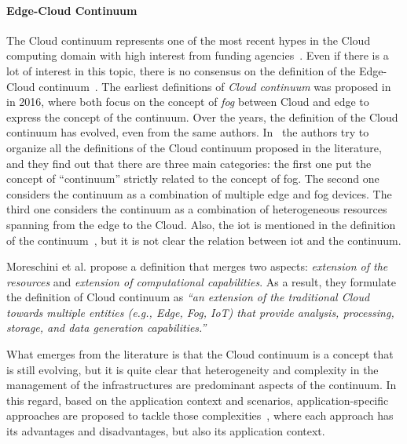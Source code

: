 \documentclass[12pt,a4paper]{article}
\begin{document}
\paragraph{Edge-Cloud Continuum}
The Cloud continuum represents one of the most recent hypes in the Cloud computing domain with high interest from funding agencies~\cite{ict-40-2020, horizon-cl4-2022-data-01-02}.
%
Even if there is a lot of interest in this topic,
there is no consensus on the definition of the Edge-Cloud continuum~\cite{DBLP:journals/access/MoreschiniPLNHT22}.
%
The earliest definitions of \emph{Cloud continuum} was proposed in~\cite{DBLP:journals/corr/GuptaNCG16, DBLP:journals/iotj/ChiangZ16} in 2016,
where both focus on the concept of \emph{fog} between Cloud and edge to express the concept of the continuum.
%
Over the years, the definition of the Cloud continuum has evolved,
even from the same authors.
%
In~\cite{DBLP:journals/access/MoreschiniPLNHT22} the authors try to organize all the definitions of the Cloud continuum proposed in the literature,
and they find out that there are three main categories: the first one put the concept of ``continuum'' strictly related to the concept of fog.
%
The second one considers the continuum as a combination of multiple edge and fog devices.
%
The third one considers the continuum as a combination of heterogeneous resources spanning from the edge to the Cloud.
%
Also, the \ac{iot} is mentioned in the definition of the continuum~\cite{DBLP:conf/ucc/SpillnerGBV20, 9116796},
but it is not clear the relation between \ac{iot} and the continuum.

Moreschini et al. propose a definition that merges two aspects: \emph{extension of the resources} and \emph{extension of computational capabilities}.
%
As a result, they formulate the definition of Cloud continuum as \emph{``an extension of the traditional Cloud towards multiple entities (e.g., Edge, Fog, IoT) that provide analysis, processing, storage, and data generation capabilities.''}

What emerges from the literature is that the Cloud continuum is a concept that is still evolving,
but it is quite clear that heterogeneity and complexity in the management of the infrastructures are predominant aspects of the continuum.
%
In this regard,
based on the application context and scenarios,
application-specific approaches are proposed to tackle those complexities~\cite{DBLP:journals/tiot/NehaPSSG22, DBLP:journals/csur/WeisenburgerWS20, DBLP:journals/fi/CasadeiPPVW20},
where each approach has its advantages and disadvantages, but also its application context.
\end{document}
